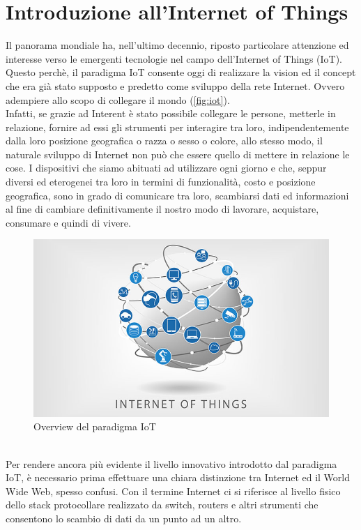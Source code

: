 \chapter{Introduzione all'Internet of Things}
\label{chap:introduzione}
Il panorama mondiale ha, nell'ultimo decennio, riposto particolare attenzione ed interesse verso le emergenti tecnologie nel campo dell'Internet of Things (IoT). \\ Questo perchè, il paradigma IoT consente oggi di realizzare la vision ed il concept che era già stato supposto e predetto come sviluppo della rete Internet. Ovvero adempiere allo scopo di collegare il mondo (\autoref{fig:iot}). \\
Infatti, se grazie ad Interent è stato possibile collegare le persone, metterle in relazione, fornire ad essi gli strumenti per interagire tra loro, indipendentemente dalla loro posizione geografica o razza o sesso o colore, allo stesso modo, il naturale sviluppo di Internet non può che essere quello di mettere in relazione le cose. I dispositivi che siamo abituati ad utilizzare ogni giorno e che, seppur diversi ed eterogenei tra loro in termini di funzionalità, costo e posizione geografica, sono in grado di comunicare tra loro, scambiarsi dati ed informazioni al fine di cambiare definitivamente il nostro modo di lavorare, acquistare, consumare e quindi di vivere.
\begin{figure}
\begin{center}
\includegraphics[width=0.7\columnwidth]{images/iot.jpg}
\end{center}
\caption{Overview del paradigma IoT}
\label{fig:iot}
\end{figure}
\\Per rendere ancora più evidente il livello innovativo introdotto dal paradigma IoT, è necessario prima effettuare una chiara distinzione tra Internet ed il World Wide Web, spesso confusi.
Con il termine Internet ci si riferisce al livello fisico dello stack protocollare realizzato da switch, routers e altri strumenti che consentono lo scambio di dati da un punto ad un altro.
